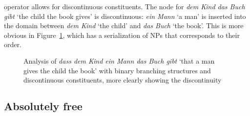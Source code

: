 \documentclass[output=paper]{langsci/langscibook}
\begin{document}
operator allows for discontinuous constituents. The node for \emph{dem Kind das Buch gibt} `the
child the book gives' is discontinuous: \emph{ein Mann} `a man' is inserted into the domain between
\emph{dem Kind} `the child' and \emph{das Buch} `the book'.  This is more obvious in Figure~\ref{fig-the-child-reads-the-book-reape-binary-discont}, which has a serialization of NPs that
corresponds to their order.
\begin{figure}
\caption{\label{fig-the-child-reads-the-book-reape-binary-discont}Analysis of \emph{dass dem Kind ein Mann das Buch
    gibt} `that a man gives the child the book' with binary branching structures and discontinuous
  constituents, more clearly showing the discontinuity}
\end{figure}%


\subsection{Absolutely free}
\label{sec-absolutely-free}\label{sec-warlpiri}
\end{document}
